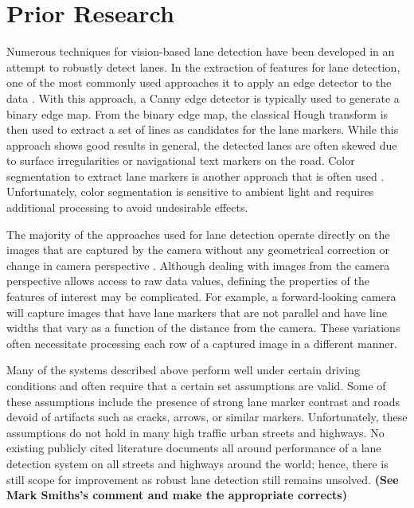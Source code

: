 \documentclass{article}
\begin{document}
\section{Prior Research}
\label{sec:prior}
Numerous techniques for vision-based lane detection have been developed in an attempt to robustly detect lanes.
In the extraction of features for lane detection, one of the most commonly used approaches it to apply an edge detector to the data \cite{assidiq_real_2008,wang_driver_2005}. With this approach, a Canny edge detector is typically used to generate a binary edge map. From the binary edge map, the classical Hough transform is then used to extract a set of lines as candidates for the lane markers.  While this approach shows good results in general, the detected lanes are often skewed due to surface irregularities or navigational text markers on the road. Color segmentation to extract lane markers is another approach that is often used \cite{sun_hsi_2006,chin_lane_2005}. Unfortunately, color segmentation is sensitive to ambient light and requires additional processing to avoid undesirable effects.

The majority of the approaches used for lane detection operate directly on the images that are captured by the camera without any geometrical correction or change in camera perspective \cite{borkar_layered_2009,assidiq_real_2008,sun_hsi_2006,wang_real-time_2006}.
Although dealing with images from the camera perspective allows access to raw data values, defining the properties of the features of interest may be complicated. For example, a forward-looking camera will capture images that have lane markers that are not parallel and have line widths that vary as a function of the distance from the camera.  These variations often necessitate processing each row of a captured image in a different manner.

Many of the systems described above perform well under certain driving conditions and often require that a certain set assumptions are valid.  Some of these assumptions include the  presence of strong lane marker contrast and roads devoid of artifacts such as cracks, arrows, or similar markers. Unfortunately, these assumptions do not hold in many high traffic urban streets and highways. No existing publicly cited literature documents all around performance of a lane detection system on all streets and highways around the world; hence, there is still scope for improvement as robust lane detection still remains unsolved. {\bf (See Mark Smiths's comment and make the appropriate corrects)}
\end{document}
